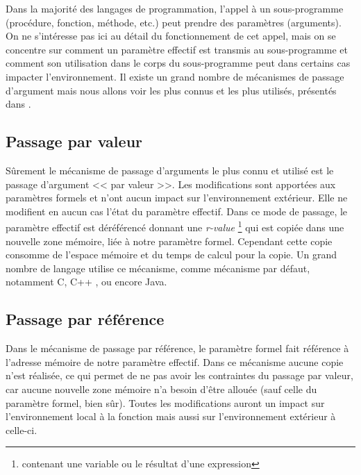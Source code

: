 
      \label{sec:arguments}
            
   Dans la majorité des langages de programmation, l'appel à un sous-programme (procé\-dure, fonction, méthode, etc.) peut prendre des paramètres (arguments). On ne s'inté\-resse pas ici au détail du fonctionnement de cet appel, mais on se concentre sur comment un paramètre effectif est transmis au sous-programme et comment son utilisation dans le corps du sous-programme peut dans certains cas impacter l'environnement. Il existe un grand nombre de mécanismes de passage d'argument mais nous allons voir les plus connus et les plus utilisés, présentés dans \cite{DBLP:books/daglib/0069787}.
  
    \subsection{Passage par valeur}
      
      Sûrement le mécanisme de passage d'arguments le plus connu et utilisé est le passage d'argument  << par valeur >>. Les modifications sont apportées aux paramètres formels et n'ont aucun impact sur l'environnement extérieur. Elle ne modifient en aucun cas l'état du paramètre effectif. Dans ce mode de passage, le paramètre effectif est déréférencé donnant une \emph{r-value} \footnote{contenant une variable ou le résultat d'une expression} qui est copiée dans une nouvelle zone mémoire, liée à notre paramètre formel. Cependant cette copie consomme de l'espace mémoire et du temps de calcul pour la copie. Un grand nombre de langage utilise ce mécanisme, comme mécanisme par défaut, notamment C, C++ \cite{Stroustrup:2000:CPL:518791}, ou encore Java.

    \subsection{Passage par référence}
    
     Dans le mécanisme de passage par référence, le paramètre formel fait référence à l'adresse mémoire de notre paramètre effectif. Dans ce mécanisme aucune copie n'est réalisée, ce qui permet de ne pas avoir les contraintes du passage par valeur, car aucune nouvelle zone mémoire n'a besoin d'être allouée (sauf celle du paramètre formel, bien sûr). Toutes les modifications auront un impact sur l'environnement local à la fonction mais aussi sur l'environnement extérieur à celle-ci.  
    
